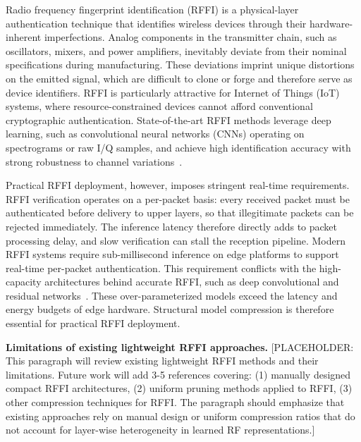 \documentclass[journal,comsoc]{IEEEtran}
\begin{document}
Radio frequency fingerprint identification (RFFI) is a physical-layer authentication technique that identifies wireless devices through their hardware-inherent imperfections. Analog components in the transmitter chain, such as oscillators, mixers, and power amplifiers, inevitably deviate from their nominal specifications during manufacturing. These deviations imprint unique distortions on the emitted signal, which are difficult to clone or forge and therefore serve as device identifiers. RFFI is particularly attractive for Internet of Things (IoT) systems, where resource-constrained devices cannot afford conventional cryptographic authentication. State-of-the-art RFFI methods leverage deep learning, such as convolutional neural networks (CNNs) operating on spectrograms or raw I/Q samples, and achieve high identification accuracy with strong robustness to channel variations~\cite{9488793,9715147}.

Practical RFFI deployment, however, imposes stringent real-time requirements. RFFI verification operates on a per-packet basis: every received packet must be authenticated before delivery to upper layers, so that illegitimate packets can be rejected immediately. The inference latency therefore directly adds to packet processing delay, and slow verification can stall the reception pipeline. Modern RFFI systems require sub-millisecond inference on edge platforms to support real-time per-packet authentication. This requirement conflicts with the high-capacity architectures behind accurate RFFI, such as deep convolutional and residual networks~\cite{7780459}. These over-parameterized models exceed the latency and energy budgets of edge hardware. Structural model compression is therefore essential for practical RFFI deployment.

\textbf{Limitations of existing lightweight RFFI approaches.}
[PLACEHOLDER: This paragraph will review existing lightweight RFFI methods and their limitations. Future work will add 3-5 references covering: (1) manually designed compact RFFI architectures, (2) uniform pruning methods applied to RFFI, (3) other compression techniques for RFFI. The paragraph should emphasize that existing approaches rely on manual design or uniform compression ratios that do not account for layer-wise heterogeneity in learned RF representations.]
\end{document}
